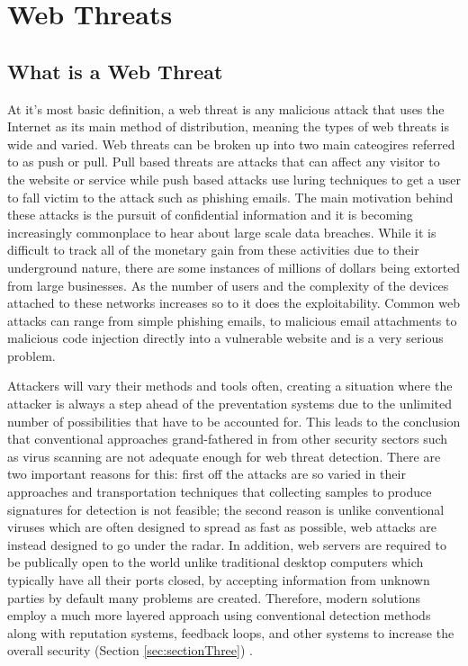 \chapter{Web Threats} \label{sec:sectionTwo}
\section{What is a Web Threat}

At it's most basic definition, a web threat is any malicious attack that uses the Internet as its main method of distribution, meaning the types of web threats is wide and varied.  Web threats can be broken up into two main cateogires referred to as push or pull.  Pull based threats are attacks that can affect any visitor to the website or service while push based attacks use luring techniques to get a user to fall victim to the attack such as phishing emails.  The main motivation behind these attacks is the pursuit of confidential information and it is becoming increasingly commonplace to hear about large scale data breaches.  While it is difficult to track all of the monetary gain from these activities due to their underground nature, there are some instances of millions of dollars being extorted from large businesses.  As the number of users and the complexity of the devices attached to these networks increases so to it does the exploitability.  Common web attacks can range from simple phishing emails, to malicious email attachments to malicious code injection directly into a vulnerable website and is a very serious problem.

Attackers will vary their methods and tools often, creating a situation where the attacker is always a step ahead of the preventation systems due to the unlimited number of possibilities that have to be accounted for.  This leads to the conclusion that conventional approaches grand-fathered in from other security sectors such as virus scanning are not adequate enough for web threat detection.  There are two important reasons for this: first off the attacks are so varied in their approaches and transportation techniques that collecting samples to produce signatures for detection is not feasible; the second reason is unlike conventional viruses which are often designed to spread as fast as possible, web attacks are instead designed to go under the radar.  In addition, web servers are required to be publically open to the world unlike traditional desktop computers which typically have all their ports closed, by accepting information from unknown parties by default many problems are created.  Therefore, modern solutions employ a much more layered approach using conventional detection methods along with reputation systems, feedback loops, and other systems to increase the overall security (Section \ref{sec:sectionThree}) \cite{trendMicro}.

